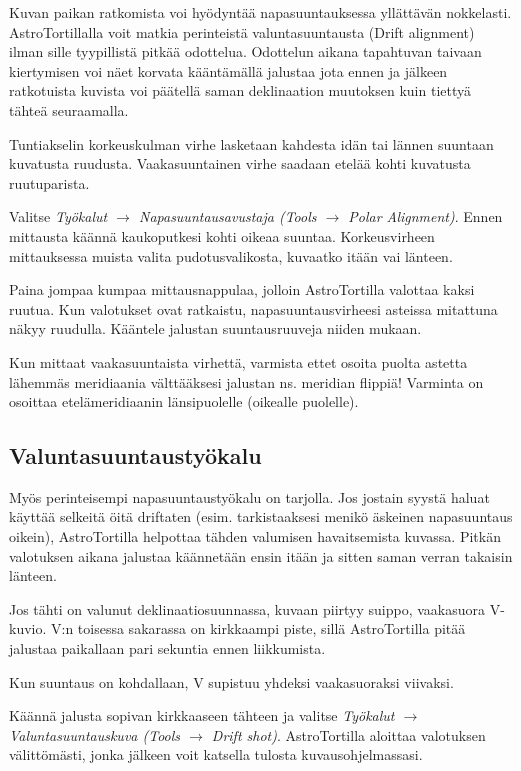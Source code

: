 \documentclass{article}
\begin{document}
Kuvan paikan ratkomista voi hyödyntää napasuuntauksessa yllättävän nokkelasti.
AstroTortillalla voit matkia perinteistä valuntasuuntausta (Drift alignment) 
ilman sille tyypillistä pitkää odottelua. Odottelun aikana tapahtuvan taivaan
kiertymisen voi näet korvata kääntämällä jalustaa jota ennen ja jälkeen ratkotuista 
kuvista voi päätellä saman deklinaation muutoksen kuin tiettyä tähteä seuraamalla.

Tuntiakselin korkeuskulman virhe lasketaan kahdesta idän tai lännen suuntaan kuvatusta ruudusta.
Vaakasuuntainen virhe saadaan etelää kohti kuvatusta ruutuparista.

Valitse \emph{Työkalut $\rightarrow$ Napasuuntausavustaja
(Tools $\rightarrow$ Polar Alignment)}. Ennen mittausta käännä kaukoputkesi 
kohti oikeaa suuntaa.  Korkeusvirheen mittauksessa muista valita pudotusvalikosta, kuvaatko itään vai länteen.

Paina jompaa kumpaa mittausnappulaa, jolloin AstroTortilla
valottaa kaksi ruutua. Kun valotukset ovat ratkaistu, napasuuntausvirheesi
asteissa mitattuna näkyy ruudulla. Kääntele jalustan suuntausruuveja niiden mukaan.

Kun mittaat vaakasuuntaista virhettä, varmista ettet osoita puolta astetta
lähemmäs meridiaania välttääksesi jalustan ns. meridian flippiä! Varminta on
osoittaa etelämeridiaanin länsipuolelle (oikealle puolelle).



\subsection{Valuntasuuntaustyökalu}

Myös perinteisempi napasuuntaustyökalu on tarjolla. Jos jostain syystä haluat 
käyttää selkeitä öitä driftaten (esim. tarkistaaksesi menikö äskeinen napasuuntaus oikein),
AstroTortilla helpottaa tähden valumisen havaitsemista kuvassa. Pitkän valotuksen aikana jalustaa käännetään ensin itään ja sitten saman verran takaisin länteen.

Jos tähti on valunut deklinaatiosuunnassa, kuvaan piirtyy suippo,
vaakasuora V-kuvio. V:n toisessa sakarassa on kirkkaampi piste, 
sillä AstroTortilla pitää jalustaa paikallaan pari sekuntia ennen liikkumista.

Kun suuntaus on kohdallaan, V supistuu yhdeksi vaakasuoraksi viivaksi.

Käännä jalusta sopivan kirkkaaseen tähteen ja valitse
\emph{Työkalut $\rightarrow$
Valuntasuuntauskuva (Tools $\rightarrow$ Drift shot)}. AstroTortilla aloittaa valotuksen välittömästi, jonka jälkeen voit katsella tulosta
kuvausohjelmassasi.
\end{document}
